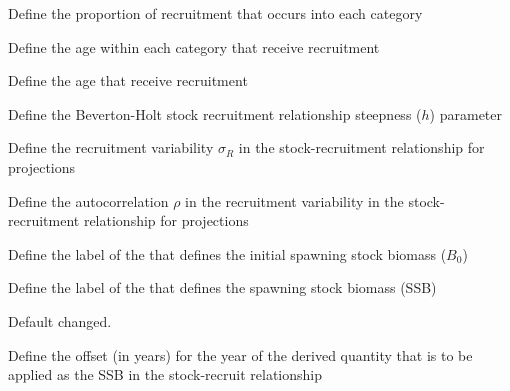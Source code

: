  {Define the proportion of recruitment that occurs into each category}

\TOUNDO

 {Define the age within each category that receive recruitment}

\TOUNDOend

\TODO

 {Define the age that receive recruitment}

\TODOend

 {Define the Beverton-Holt stock recruitment relationship steepness ($h$) parameter}

 {Define the recruitment variability $\sigma_R$ in the stock-recruitment relationship for projections}

 {Define the autocorrelation $\rho$ in the recruitment variability in the stock-recruitment relationship for projections}

\TODO

 {Define the label of the  that defines the initial spawning stock biomass ($B_0$)}

\TODOend

 {Define the label of the  that defines the spawning stock biomass (SSB)}

\TODO 

Default changed.

 {Define the offset (in years) for the year of the derived quantity that is to be applied as the SSB in the stock-recruit relationship}

\TODOend\

